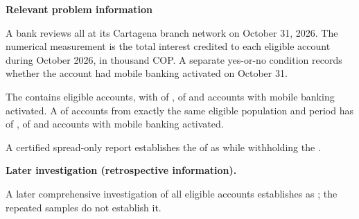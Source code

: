 \clearpage



\textbf{Relevant problem information}

\begin{probleminfoexcerpt}
A bank reviews all      at its Cartagena branch network on October 31, 2026. The numerical measurement is the total interest credited to each eligible account during October 2026, in thousand COP. A separate yes-or-no condition records whether the account had mobile banking activated on October 31.
\end{probleminfoexcerpt}

\begin{probleminfoexcerpt}
The     contains  eligible accounts, with    of   ,    of    and  accounts with mobile banking activated. A     of  accounts from exactly the same eligible population and period has   of   ,    of    and  accounts with mobile banking activated.
\end{probleminfoexcerpt}

\begin{probleminfoexcerpt}
A certified spread-only report establishes the    of  as    while withholding the   .
\end{probleminfoexcerpt}

\textbf{Later investigation (retrospective information).}

\begin{probleminfoexcerpt}
A later comprehensive investigation of all eligible accounts establishes   as   ; the repeated samples do not establish it.
\end{probleminfoexcerpt}

